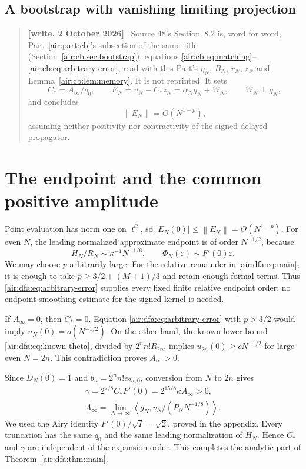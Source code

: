 \documentclass[11pt,letterpaper]{article}
\numberwithin{equation}{section}
\theoremstyle{remark}
\newcommand{\norm}[1]{\left\lVert#1\right\rVert}
\newcommand{\ip}[2]{\left\langle#1,#2\right\rangle}
\newcommand{\eps}{\varepsilon}
\newenvironment{writenote}{\par\smallskip\begin{quote}\small\textbf{[write, 2 October 2026]}\ }{\end{quote}\smallskip}
\begin{document}
\subsection{A bootstrap with vanishing limiting projection}
\begin{writenote}
Source 48's Section~8.2 is, word for word, Part~\ref{air:part:cb}'s subsection of the same title (Section~\ref{air:cb:sec:bootstrap}), equations \eqref{air:cb:eq:matching}--\eqref{air:cb:eq:arbitrary-error}, read with this Part's $\eta_N$, $B_N$, $r_N$, $z_N$ and Lemma~\ref{air:cb:lem:memory}. It is not reprinted. It sets
\begin{equation}\label{air:dfa:eq:matching}
C_* = A_\infty/q_0,\qquad E_N=u_N-C_*z_N
=\alpha_Ng_N+W_N,\qquad W_N\perp g_N,
\end{equation}
and concludes
\begin{equation}\label{air:dfa:eq:arbitrary-error}
\norm{E_N}=O(N^{1-p}),
\end{equation}
assuming neither positivity nor contractivity of the signed delayed propagator.
\end{writenote}

\section{The endpoint and the common positive amplitude}

Point evaluation has norm one on $\ell^2$, so
$|E_N(0)|\le\norm{E_N}=O(N^{1-p})$. For even $N$, the leading normalized approximate
endpoint is of order $N^{-1/2}$, because
\[
H_N/R_N\sim\kappa^{-1}N^{-1/6},\qquad
\Phi_N(\eps)\sim F'(0)\eps.
\]
We may choose $p$ arbitrarily large. For the relative remainder in
\eqref{air:dfa:eq:main}, it is enough to take
$p\ge3/2+(M+1)/3$ and retain enough formal terms. Thus
\eqref{air:dfa:eq:arbitrary-error} supplies every fixed finite relative endpoint
order; no endpoint smoothing estimate for the signed kernel is needed.

If $A_\infty=0$, then $C_*=0$. Equation \eqref{air:dfa:eq:arbitrary-error} with
$p>3/2$ would imply $u_N(0)=o(N^{-1/2})$. On the other hand, the known
lower bound \eqref{air:dfa:eq:known-theta}, divided by $2^n n!R_{2n}$, implies
$u_{2n}(0)\ge cN^{-1/2}$ for large even $N=2n$. This contradiction proves
$A_\infty>0$.

Since $D_N(0)=1$ and $b_n=2^n n!e_{2n,0}$, conversion from $N$ to $2n$ gives
\begin{equation}\label{air:dfa:eq:gamma}
\begin{gathered}
\gamma=2^{7/8}C_*F'(0)=2^{15/8}\kappa A_\infty>0,\\
 A_\infty=\lim_{N\to\infty}\ip{g_N}{v_N/(P_NN^{-1/8})}.
\end{gathered}
\end{equation}
We used the Airy identity $F'(0)/\sqrt I=\sqrt2$, proved in the appendix.
Every truncation has the same $q_0$ and the same leading normalization of
$H_N$. Hence $C_*$ and $\gamma$ are independent of the expansion order.
This completes the analytic part of Theorem~\ref{air:dfa:thm:main}.
\end{document}
